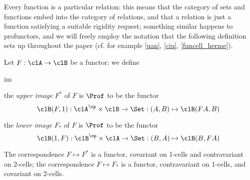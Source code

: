 Every function is a particular relation: this means that the category of sets and functions embed into the category of relations, and that a relation is just a function satisfying a suitable rigidity request; something similar happens to profunctors, and we will freely employ the notation that the following definition sets up throughout the paper (cf. for example \autoref{uan}, \autoref{ciu}, \autoref{funcell_herme}).
\begin{definition}\label{upper_n_lower}
	Let $F : \clA \to \clB$ be a functor; we define 
	\begin{enumtag}{im}
		\item the \emph{upper image} $F^*$ of $F$ is $\Prof$ to be the functor 
		\[ \clB(F,1) : \clA^\op\times\clB \to\Set : (A,B)\mapsto \clB(FA,B) \]
		\item the \emph{lower image} $F_*$ of $F$ is $\Prof$ to be the functor 
		\[ \clB(1,F) : \clB^\op\times\clA \to\Set : (B,A)\mapsto \clB(B,FA) \]
	\end{enumtag}
	The correspondence $F\mapsto F^*$ is a functor, covariant on 1-cells and contravariant on 2-cells; the correspondence $F\mapsto F_*$ is a functor, contravariant on 1-cells, and covariant on 2-cells.
\end{definition}
